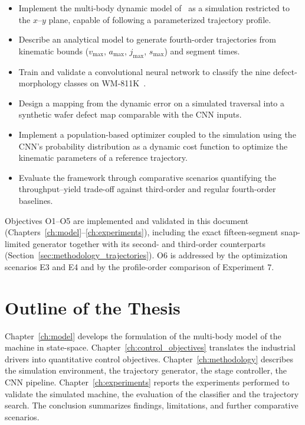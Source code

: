 \begin{itemize}
    \item[\textbf{O1}] Implement the multi-body dynamic model of~\cite{Al-Rawashdeh2022_Caracterization} as a simulation restricted to the $x$--$y$ plane, capable of following a parameterized trajectory profile.
    \item[\textbf{O2}] Describe an analytical model to generate fourth-order trajectories from kinematic bounds ($v_{\max}$, $a_{\max}$, $j_{\max}$, $s_{\max}$) and segment times.
    \item[\textbf{O3}] Train and validate a convolutional neural network to classify the nine defect-morphology classes on WM-811K~\cite{Wu2015_WM811K}.
    \item[\textbf{O4}] Design a mapping from the dynamic error on a simulated traversal into a synthetic wafer defect map comparable with the CNN inputs.
    \item[\textbf{O5}] Implement a population-based optimizer coupled to the simulation using the CNN's probability distribution as a dynamic cost function to optimize the kinematic parameters of a reference trajectory.
    \item[\textbf{O6}] Evaluate the framework through comparative scenarios quantifying the throughput--yield trade-off against third-order and regular fourth-order baselines.
\end{itemize}

Objectives O1--O5 are implemented and validated in this document (Chapters~\ref{ch:model}--\ref{ch:experiments}), including the exact fifteen-segment snap-limited generator together with its second- and third-order counterparts (Section~\ref{sec:methodology_trajectories}). O6 is addressed by the optimization scenarios E3 and E4 and by the profile-order comparison of Experiment 7.

\section{Outline of the Thesis}\label{sec:intro_outline}

Chapter~\ref{ch:model} develops the formulation of the multi-body model of the machine in state-space. Chapter~\ref{ch:control_objectives} translates the industrial drivers into quantitative control objectives. Chapter~\ref{ch:methodology} describes the simulation environment, the trajectory generator, the stage controller, the CNN pipeline. Chapter~\ref{ch:experiments} reports the experiments performed to validate the simulated machine, the evaluation of the classifier and the trajectory search. The conclusion summarizes findings, limitations, and further comparative scenarios.

\medskip

